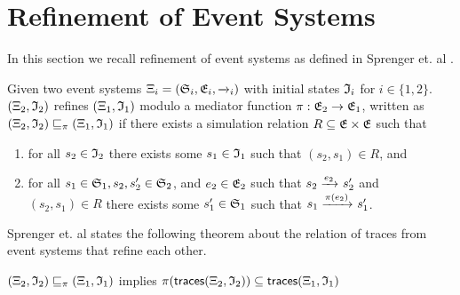 \section{Refinement of Event Systems}
\label{section:event-system-refinement}

In this section we recall refinement of event systems as defined in Sprenger et. al
\cite{igloo}.

\begin{definition}
    \label{def:event-system-refinement}
    Given two event systems
    $\Xi_i = \left( \mathfrak{S}_i, \mathfrak{E}_i, \xrightarrow{}_{i} \right)$
    with initial states $\mathfrak{I}_i$ for $i\in \lbrace1,2\rbrace$.
    $\left(\Xi_2, \mathfrak{I}_2 \right)$ refines
    $\left(\Xi_1, \mathfrak{I}_1 \right)$
    modulo a mediator function $\pi : \mathfrak{E}_2 \to \mathfrak{E}_1$,
    written as 
    $\left(\Xi_2, \mathfrak{I}_2 \right) \sqsubseteq_\pi
    \left(\Xi_1, \mathfrak{I}_1 \right)$
    if there exists a simulation relation $R \subseteq \mathfrak{E} \times \mathfrak{E}$
    such that
    \begin{enumerate}
        \item for all $s_2 \in \mathfrak{I}_2$ there exists some
        $s_1 \in \mathfrak{I}_1$ such that $(s_2, s_1) \in R$, and
        \item for all $s_1 \in \mathfrak{S}_1,
            s_2, s_2' \in \mathfrak{S}_2$, and 
        $e_2 \in \mathfrak{E}_2$ such that
        $s_2 \xrightarrow{e_2}_{} s_2'$ and $(s_2, s_1) \in R$
        there exists some $s_1' \in \mathfrak{S}_1$ such that
        $s_1 \xrightarrow{\pi(e_2)}_{} s_1'$.
    \end{enumerate}
\end{definition}

Sprenger et. al \cite[Theorem 2.1]{igloo} states the following theorem about the relation
of traces from event systems that refine each other.

\begin{theorem}
    \label{theo:refinement-traces}
    $(\Xi_2, \mathfrak{I}_2) \sqsubseteq_\pi
    (\Xi_1, \mathfrak{I}_1)$
    implies
    $\pi(\mathsf{traces}(\Xi_2, \mathfrak{I}_2))
    \subseteq \mathsf{traces}(\Xi_1, \mathfrak{I}_1)$
\end{theorem}

